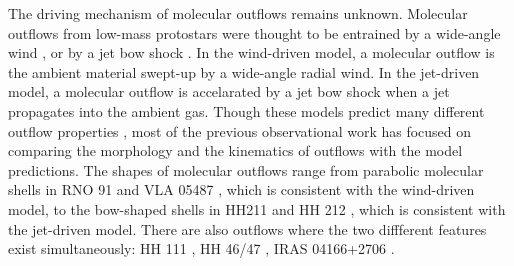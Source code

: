 The driving mechanism of molecular outflows remains unknown. Molecular outflows from low-mass protostars were thought to be entrained by a wide-angle wind \citep{1991ApJ...370L..31S, 2001ApJ...557..429L}, or by a jet bow shock \citep{ 1993A&A...278..267R, 1993ApJ...414..230M, 2001ApJ...557..429L}. In the wind-driven model, a molecular outflow is the ambient material swept-up by a wide-angle radial wind. In the jet-driven model, a molecular outflow is accelarated by a jet bow shock when a jet propagates into the ambient gas. Though these models predict many different outflow properties \citep{2007prpl.conf..245A}, most of the previous observational work has focused on comparing the morphology and the kinematics of outflows with the model predictions. The shapes of molecular outflows range from parabolic molecular shells in RNO 91 and VLA 05487 \citep{2000ApJ...542..925L}, which is consistent with the wind-driven model, to the bow-shaped shells in HH211 \citep{1999A&A...343..571G} and HH 212 \citep{2000ApJ...542..925L, 2015ApJ...805..186L}, which is consistent with the jet-driven model. There are also outflows where the two diffferent features exist simultaneously: HH 111 \citep{2000ApJ...542..925L}, HH 46/47 \citep{2013ApJ...774...39A, 2016ApJ...832..158Z}, IRAS 04166+2706 \citep{2009A&A...495..169S}.
